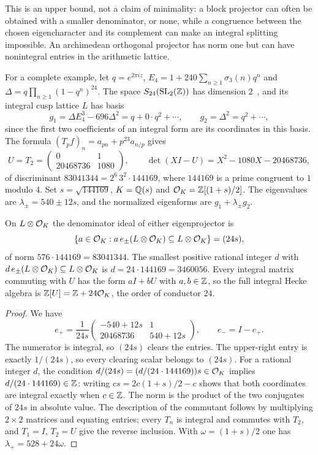 This is an upper bound, not a claim of minimality: a block projector can
often be obtained with a smaller denominator, or none, while a congruence
between the chosen eigencharacter and its complement can make an integral
splitting impossible. An archimedean orthogonal projector has norm one but
can have nonintegral entries in the arithmetic lattice.

For a complete example, let $q=e^{2\pi iz}$,
$E_4=1+240\sum_{n\ge1}\sigma_3(n)q^n$ and
$\Delta=q\prod_{n\ge1}(1-q^n)^{24}$. The space $S_{24}(\operatorname{SL}_2(\mathbb{Z}))$ has
dimension $2$~\cite{Hida2019Modular}, and its integral cusp lattice $L$ has
basis
\[
 g_1=\Delta E_4^3-696\Delta^2=q+0\cdot q^2+\cdots,\qquad
 g_2=\Delta^2=q^2+\cdots,
\]
since the first two coefficients of an integral form are its coordinates
in this basis. The formula $(T_pf)_n=a_{pn}+p^{23}a_{n/p}$ gives
\begin{equation}\label{sel:eq:t2}
 U=T_2=\begin{pmatrix}0&1\\20468736&1080\end{pmatrix},\qquad
 \det(XI-U)=X^2-1080X-20468736,
\end{equation}
of discriminant $83041344=2^6\,3^2\cdot144169$, where $144169$ is a prime
congruent to $1$ modulo $4$. Set $s=\sqrt{144169}$, $K=\mathbb{Q}(s)$ and
$\mathcal{O}_K=\mathbb{Z}[(1+s)/2]$. The eigenvalues are $\lambda_\pm=540\pm12s$, and the
normalized eigenforms are $g_1+\lambda_\pm g_2$.

\begin{proposition}\label{sel:prop:weight24}
On $L\otimes\mathcal{O}_K$ the denominator ideal of either eigenprojector is
\[
 \{a\in\mathcal{O}_K:a\,e_\pm(L\otimes\mathcal{O}_K)\subseteq L\otimes\mathcal{O}_K\}=(24s),
\]
of norm $576\cdot144169=83041344$. The smallest positive rational integer
$d$ with $d\,e_\pm(L\otimes\mathcal{O}_K)\subseteq L\otimes\mathcal{O}_K$ is
$d=24\cdot144169=3460056$. Every integral matrix commuting with $U$ has the
form $aI+bU$ with $a,b\in\mathbb{Z}$, so the full integral Hecke algebra is
$\mathbb{Z}[U]=\mathbb{Z}+24\mathcal{O}_K$, the order of conductor $24$.
\end{proposition}

\begin{proof}
We have
\[
 e_+=\frac1{24s}\begin{pmatrix}-540+12s&1\\20468736&540+12s\end{pmatrix},
 \qquad e_-=I-e_+ .
\]
The numerator is integral, so $(24s)$ clears the entries. The upper-right
entry is exactly $1/(24s)$, so every clearing scalar belongs to $(24s)$.
For a rational integer $d$, the condition
$d/(24s)=(d/(24\cdot144169))s\in\mathcal{O}_K$ implies
$d/(24\cdot144169)\in\mathbb{Z}$: writing $cs=2c(1+s)/2-c$ shows that both
coordinates are integral exactly when $c\in\mathbb{Z}$. The norm is the product of
the two conjugates of $24s$ in absolute value. The description of the
commutant follows by multiplying $2\times2$ matrices and equating entries;
every $T_n$ is integral and commutes with $T_2$, and $T_1=I$, $T_2=U$ give
the reverse inclusion. With $\omega=(1+s)/2$ one has
$\lambda_+=528+24\omega$.
\end{proof}

